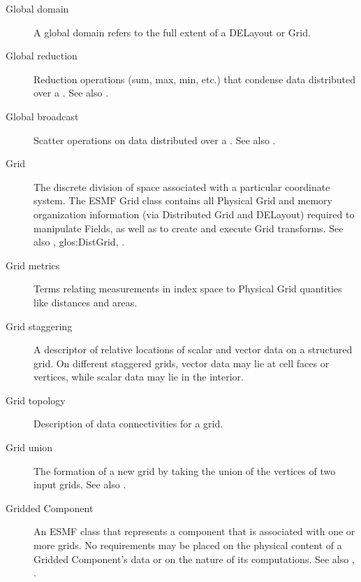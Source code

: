 \begin{description}
\label{glos:GlobDomain}
\item[Global domain] 
  A global domain refers to the full extent of a DELayout or Grid.

\label{glos:GlobReduction} 
\item[Global reduction] 
  Reduction operations (sum, max, min, etc.) that condense data distributed
  over a .
  See also .

\label{glos:GlobBroadcast}
\item[Global broadcast] 
  Scatter operations on data distributed over a 
  .
  See also .

\label{glos:Grid} 
\item[Grid] 
  The discrete division of space associated with
  a particular coordinate system.  The ESMF Grid class contains all 
  Physical Grid and memory 
  organization information (via Distributed Grid and DELayout) required 
  to manipulate 
  Fields, as well as to create and execute Grid transforms. 
  See also , 
  {glos:DistGrid}, .

\label{glos:GridMetrics} 
\item[Grid metrics] 
  Terms relating measurements 
  in index space to Physical Grid quantities like distances and areas.

\label{glos:GridStagger} 
\item[Grid staggering] 
  A descriptor of relative locations
  of scalar and vector data on a structured grid. On different
  staggered grids, vector data may lie at cell faces or vertices,
  while scalar data may lie in the interior. 

\label{glos:GridTopo} 
\item[Grid topology] 
  Description of data connectivities for a grid.

\label{glos:GridUnion} 
\item[Grid union] 
  The formation of a new grid
  by taking the union of the vertices of two input grids.
  See also . 

\label{glos:GridComp}
\item[Gridded Component] 
  An ESMF class that represents a component that is associated with one 
  or more grids.  No requirements 
  may be placed on the physical content of a Gridded Component's data or 
  on the nature of its computations. See also ,
  . 


\end{description}
